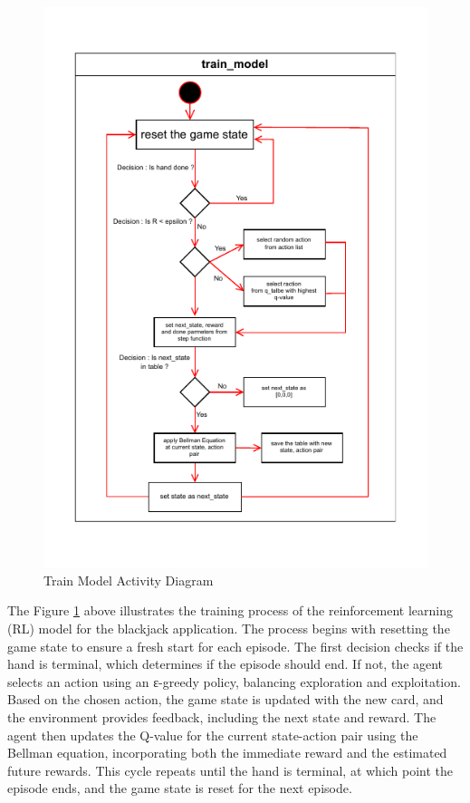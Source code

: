 \documentclass[a4paper,12pt]{report}
\begin{document}
\baselineskip
\begin{figure}[htb]
\begin{center}
\includegraphics[scale=1.2,keepaspectratio]{figures/train_model_activitydiagram.pdf}
\end{center}
\caption{Train Model Activity Diagram}
\label{fig:train_model_activitydiagram}
\end{figure}

The Figure \ref{fig:train_model_activitydiagram} above illustrates the training process of the reinforcement learning (RL) model for the blackjack application. The process begins with resetting the game state to ensure a fresh start for each episode. The first decision checks if the hand is terminal, which determines if the episode should end. If not, the agent selects an action using an ε-greedy policy, balancing exploration and exploitation. Based on the chosen action, the game state is updated with the new card, and the environment provides feedback, including the next state and reward. The agent then updates the Q-value for the current state-action pair using the Bellman equation, incorporating both the immediate reward and the estimated future rewards. This cycle repeats until the hand is terminal, at which point the episode ends, and the game state is reset for the next episode.
\end{document}
